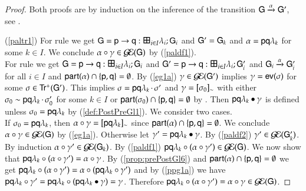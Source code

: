 \begin{proof}
Both proofs are by induction on the inference of the transition
$\G\stackred\alpha \G'$, see .

(\ref{paltr1}) For rule  we get $\G=\gt\pp\q i I \la \G$ and $\G'=\G_k$ and $\alpha=\Comm\pp{\la_k}\q$ for some $k\in I$. We conclude $\preG\comocc{\alpha}\in \EGG(\G)$ by (\ref{paldf1}).\\
For rule  we get $\G=\gt\pp\q i I \la \G$ and $\G'=\gtp\pp\q i I \la \G$ and $\G_i\stackred\alpha \G'_i$ for all $i\in I$ and $\participant{\alpha}\cap\set{\pp,\q}=\emptyset$. By (\ref{eg1a}) $\comocc\in\EGG( \G')$ implies $\comocc=\ev\comseq$ for some $\comseq\in\FPaths{\G'}$. This implies $\comseq=\concat{\Comm\pp{\la_k}\q}{\comseq'}$ and $\comocc=\eqclass{\comseq_0}$ 
with either $\comseq_0\sim \concat{\Comm\pp{\la_k}\q}{\comseq'_0}$ for some $k\in I$ or $\participant{\comseq_0}\cap\set{\pp,\q}=\emptyset$ by . Then $\postG\comocc{\Comm\pp{\la_k}\q}$ is defined unless $\comseq_0=\Comm\pp{\la_k}\q$ by (\ref{def:PostPreGl1}). We consider two cases.\\
If $\comseq_0=\Comm\pp{\la_k}\q$, then $\preG\comocc{\alpha}=\eqclass{\Comm\pp{\la_k}\q}$ since $\participant{\alpha}\cap\set{\pp,\q}=\emptyset$. We conclude $\preG\comocc{\alpha}\in \EGG(\G)$ by (\ref{eg1a}). Otherwise let $\comocc'=\postG\comocc{\Comm\pp{\la_k}\q}$. By (\ref{paldf2}) $\comocc'\in \EGG(\G_k')$. By induction $\preG{\comocc'}{\alpha}\in \EGG(\G_k)$.
By (\ref{paldf1}) $\preG{(\preG{\comocc'}{\alpha})}{\Comm\pp{\la_k}\q}\in \EGG(\G)$. 
 We now show that $\preG{(\preG{\comocc'}{\alpha})}{\Comm\pp{\la_k}\q}=\preG\comocc{\alpha}$. 
 By  (\ref{prop:prePostGl6}) and $\participant{\alpha}\cap\set{\pp,\q}=\emptyset$ we get
 $\preG{(\preG{\comocc'}{\alpha})}{\Comm\pp{\la_k}\q}=\preG{(\preG{\comocc'}{{\Comm\pp{\la_k}\q}})}\alpha$ and
  by (\ref{ppg1a}) we have
 $\preG{\comocc'}{\Comm\pp{\la_k}\q}=\preG{(\postG\comocc{\Comm\pp{\la_k}\q})}{\Comm\pp{\la_k}\q}=\comocc$. Therefore
 $\preG{(\preG{\comocc'}{\alpha})}{\Comm\pp{\la_k}\q}=\preG\comocc{\alpha}\in \EGG(\G)$. 
 
%


\end{proof}

